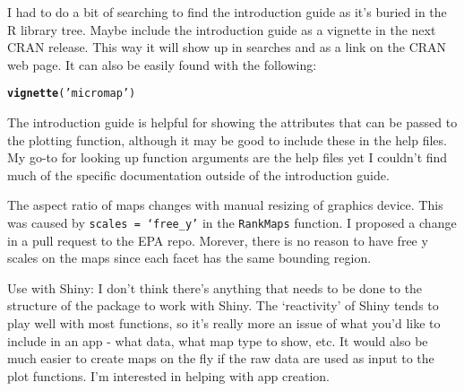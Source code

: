 \documentclass[letterpaper,12pt]{article}\usepackage[]{graphicx}\usepackage[]{color}
\makeatletter
\newcommand{\hlstr}[1]{\textcolor[rgb]{0.192,0.494,0.8}{#1}}%
\newcommand{\hlstd}[1]{\textcolor[rgb]{0.345,0.345,0.345}{#1}}%
\newcommand{\hlkwd}[1]{\textcolor[rgb]{0.737,0.353,0.396}{\textbf{#1}}}%
\newenvironment{kframe}{%
 \def\at@end@of@kframe{}%
 \ifinner\ifhmode%
  \def\at@end@of@kframe{\end{minipage}}%
  \begin{minipage}{\columnwidth}%
 \fi\fi%
 \def\FrameCommand##1{\hskip\@totalleftmargin \hskip-\fboxsep
 \colorbox{shadecolor}{##1}\hskip-\fboxsep
     \hskip-\linewidth \hskip-\@totalleftmargin \hskip\columnwidth}%
 \MakeFramed {\advance\hsize-\width
   \@totalleftmargin\z@ \linewidth\hsize
   \@setminipage}}%
 {\par\unskip\endMakeFramed%
 \at@end@of@kframe}
\makeatother
\begin{document}
I had to do a bit of searching to find the introduction guide as it's buried in the R library tree.  Maybe include the introduction guide as a vignette in the next CRAN release.  This way it will show up in searches and as a link on the CRAN web page.  It can also be easily found with the following:
\begin{kframe}
\begin{alltt}
\hlkwd{vignette}\hlstd{(}\hlstr{'micromap'}\hlstd{)}
\end{alltt}
\end{kframe}

The introduction guide is helpful for showing the attributes that can be passed to the plotting function, although it may be good to include these in the help files.  My go-to for looking up function arguments are the help files yet I couldn't find much of the specific documentation outside of the introduction guide.

The aspect ratio of maps changes with manual resizing of graphics device.  This was caused by \texttt{scales = `free\_y'} in the \texttt{RankMaps} function.  I proposed a change in a pull request to the EPA repo.  Morever, there is no reason to have free y scales on the maps since each facet has the same bounding region.

Use with Shiny: I don't think there's anything that needs to be done to the structure of the package to work with Shiny.  The `reactivity' of Shiny tends to play well with most functions, so it's really more an issue of what you'd like to include in an app - what data, what map type to show, etc.  It would also be much easier to create maps on the fly if the raw data are used as input to the plot functions.  I'm interested in helping with app creation.  
\end{document}
